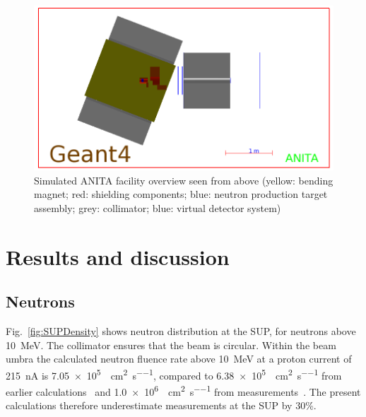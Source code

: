 \documentclass[peerreviewca,11pt,a4paper]{IEEEtran}
\let\MYoriglatexcaption\caption
\renewcommand{\caption}[2][\relax]{\MYoriglatexcaption[#2]{#2}}
\begin{document}
\begin{figure}[t]
	\centering
	\includegraphics[width=\columnwidth]{overview.png}
	\caption{
        Simulated ANITA facility overview seen from above (yellow: bending magnet; red: shielding components; blue: neutron production target assembly; grey: collimator; blue: virtual detector system)
    }
	\label{fig:ANITAoverview}
\end{figure}

\section{Results and discussion}

\subsection{Neutrons}
Fig.~\ref{fig:SUPDensity} shows neutron distribution at the SUP, for neutrons above \SI{10}{\MeV}.
The collimator ensures that the beam is circular. Within the beam umbra the calculated neutron fluence rate above \SI{10}{\MeV} at a proton current of \SI{215}{\nA} is \SI{7.05e5}{\neutron\per\cm\squared\per\second}, compared to \SI{6.38e5}{\neutron\per\cm\squared\per\second} from earlier calculations~\cite{Platt2013} and \SI{1.0e6}{\neutron\per\cm\squared\per\second} from measurements~\cite{Prokofiev2009}.
The present calculations therefore underestimate measurements at the SUP by 30\%.
\end{document}
